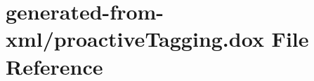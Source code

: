\hypertarget{proactiveTagging_8dox}{}\section{generated-\/from-\/xml/proactive\+Tagging.dox File Reference}
\label{proactiveTagging_8dox}
